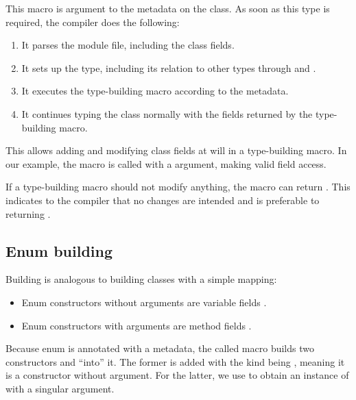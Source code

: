This macro is argument to the  metadata on the  class. As soon as this type is required, the compiler does the following:

\begin{enumerate}
	\item It parses the module file, including the class fields.
	\item It sets up the type, including its relation to other types through  and .
	\item It executes the type-building macro according to the  metadata.
	\item It continues typing the class normally with the fields returned by the type-building macro.
\end{enumerate}

This allows adding and modifying class fields at will in a type-building macro. In our example, the macro is called with a  argument, making  valid field access.

If a type-building macro should not modify anything, the macro can return . This indicates to the compiler that no changes are intended and is preferable to returning .



\subsection{Enum building}
\label{macro-enum-building}

Building  is analogous to building classes with a simple mapping:

\begin{itemize}
	\item Enum constructors without arguments are variable fields .
	\item Enum constructors with arguments are method fields .
\end{itemize}



Because enum  is annotated with a  metadata, the called macro builds two constructors  and  ``into'' it. The former is added with the kind being , meaning it is a constructor without argument. For the latter, we use  to obtain an instance of  with a singular  argument.

